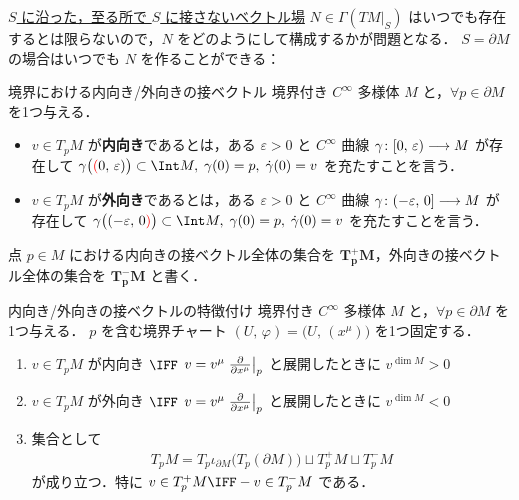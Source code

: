 \documentclass[geometry_main]{subfiles}
\begin{document}
\hyperref[def:vecf-along]{$S$ に沿った，至る所で $S$ に接さないベクトル場} $N \in \Gamma(TM|_S)$ はいつでも存在するとは限らないので，$N$ をどのようにして構成するかが問題となる．
$S = \partial M$ の場合はいつでも $N$ を作ることができる：

\begin{mydef}[label=def:inward-pointing]{境界における内向き/外向きの接ベクトル}
	境界付き $C^\infty$ 多様体 $M$ と，$\forall p \in \partial M$ を1つ与える．
	\begin{itemize}
		\item $v \in T_p M$ が\textbf{内向き}であるとは，ある $\varepsilon > 0$ と $C^\infty$ 曲線 $\gamma \colon [0,\, \varepsilon) \longrightarrow M$ が存在して $\gamma \bigl( \textcolor{red}{(}0,\, \varepsilon) \bigr) \subset \Int M,\;  \gamma(0) = p,\; \dot{\gamma}(0) = v$ を充たすことを言う．
		\item $v \in T_p M$ が\textbf{外向き}であるとは，ある $\varepsilon > 0$ と $C^\infty$ 曲線 $\gamma \colon (-\varepsilon,\, 0] \longrightarrow M$ が存在して $\gamma \bigl( (-\varepsilon,\, 0 \textcolor{red}{)} \bigr) \subset \Int M,\; \gamma(0) = p,\; \dot{\gamma}(0) = v$ を充たすことを言う．
	\end{itemize}
	点 $p \in M$ における内向きの接ベクトル全体の集合を $\bm{T_p^+ M}$，外向きの接ベクトル全体の集合を $\bm{T_p^- M}$ と書く．
\end{mydef}

\begin{mylem}[label=lem:inward-pointing]{内向き/外向きの接ベクトルの特徴付け}
	境界付き $C^\infty$ 多様体 $M$ と，$\forall p \in \partial M$ を1つ与える．
	$p$ を含む境界チャート $(U,\, \varphi) = \bigl( U,\, (x^\mu) \bigr)$ を1つ固定する．
	\begin{enumerate}
		\item $v \in T_p M$ が内向き $\IFF$ $v = v^\mu \eval{\pdv{}{x^\mu}}_p$ と展開したときに $v^{\dim M} > 0$
		\item $v \in T_p M$ が外向き $\IFF$ $v = v^\mu \eval{\pdv{}{x^\mu}}_p$ と展開したときに $v^{\dim M} < 0$
		\item 集合として
		\begin{align}
			T_p M = T_p \iota_{\partial M} \bigl( T_p (\partial M) \bigr) \sqcup T_p^+ M \sqcup T_p^- M
		\end{align}
		が成り立つ．特に $v \in T_p^+ M \IFF -v \in T_p^- M$ である．
	\end{enumerate}
	
\end{mylem}
\end{document}
